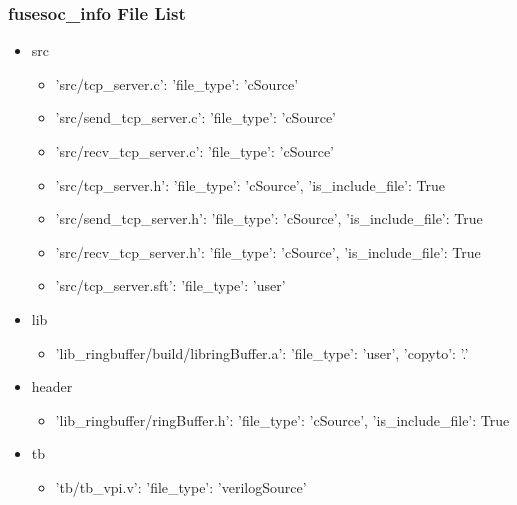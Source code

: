 \subsubsection{fusesoc\_info File List}
\begin{itemize}
\item src
	\begin{itemize}
	\item {'src/tcp\_server.c': {'file\_type': 'cSource'}}
	\item {'src/send\_tcp\_server.c': {'file\_type': 'cSource'}}
	\item {'src/recv\_tcp\_server.c': {'file\_type': 'cSource'}}
	\item {'src/tcp\_server.h': {'file\_type': 'cSource', 'is\_include\_file': True}}
	\item {'src/send\_tcp\_server.h': {'file\_type': 'cSource', 'is\_include\_file': True}}
	\item {'src/recv\_tcp\_server.h': {'file\_type': 'cSource', 'is\_include\_file': True}}
	\item {'src/tcp\_server.sft': {'file\_type': 'user'}}
	\end{itemize}
\item lib
	\begin{itemize}
	\item {'lib\_ringbuffer/build/libringBuffer.a': {'file\_type': 'user', 'copyto': '.'}}
	\end{itemize}
\item header
	\begin{itemize}
	\item {'lib\_ringbuffer/ringBuffer.h': {'file\_type': 'cSource', 'is\_include\_file': True}}
	\end{itemize}
\item tb
	\begin{itemize}
	\item {'tb/tb\_vpi.v': {'file\_type': 'verilogSource'}}
	\end{itemize}
\end{itemize}
